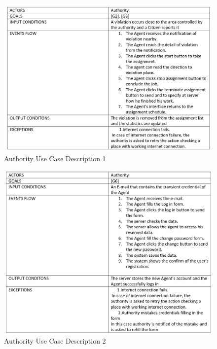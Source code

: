 \begin{figure}[h]
\centering
\includegraphics[width=\textwidth]{Images/authority_use_case.png}
\caption{\label{fig:AUCD}Authority Use Case Description 1}
\end{figure}
\begin{figure}[h]
\centering
\includegraphics[width=\textwidth]{Images/authority_use_case2.png}
\caption{\label{fig:AUCD2}Authority Use Case Description 2}
\end{figure}

